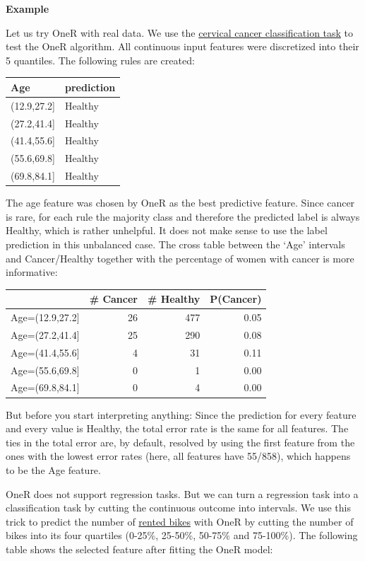 \documentclass[
  12pt,
]{krantz}
\begin{document}
\textbf{Example}

Let us try OneR with real data.
We use the \protect\hyperlink{cervical}{cervical cancer classification task} to test the OneR algorithm.
All continuous input features were discretized into their 5 quantiles.
The following rules are created:

\begin{tabular}{l|l}
\hline
Age & prediction\\
\hline
(12.9,27.2] & Healthy\\
\hline
(27.2,41.4] & Healthy\\
\hline
(41.4,55.6] & Healthy\\
\hline
(55.6,69.8] & Healthy\\
\hline
(69.8,84.1] & Healthy\\
\hline
\end{tabular}

The age feature was chosen by OneR as the best predictive feature.
Since cancer is rare, for each rule the majority class and therefore the predicted label is always Healthy, which is rather unhelpful.
It does not make sense to use the label prediction in this unbalanced case.
The cross table between the `Age' intervals and Cancer/Healthy together with the percentage of women with cancer is more informative:

\begin{tabular}{l|r|r|r}
\hline
  & \# Cancer & \# Healthy & P(Cancer)\\
\hline
Age=(12.9,27.2] & 26 & 477 & 0.05\\
\hline
Age=(27.2,41.4] & 25 & 290 & 0.08\\
\hline
Age=(41.4,55.6] & 4 & 31 & 0.11\\
\hline
Age=(55.6,69.8] & 0 & 1 & 0.00\\
\hline
Age=(69.8,84.1] & 0 & 4 & 0.00\\
\hline
\end{tabular}

But before you start interpreting anything:
Since the prediction for every feature and every value is Healthy, the total error rate is the same for all features.
The ties in the total error are, by default, resolved by using the first feature from the ones with the lowest error rates (here, all features have 55/858), which happens to be the Age feature.

OneR does not support regression tasks.
But we can turn a regression task into a classification task by cutting the continuous outcome into intervals.
We use this trick to predict the number of \protect\hyperlink{bike-data}{rented bikes} with OneR by cutting the number of bikes into its four quartiles (0-25\%, 25-50\%, 50-75\% and 75-100\%).
The following table shows the selected feature after fitting the OneR model:
\end{document}
